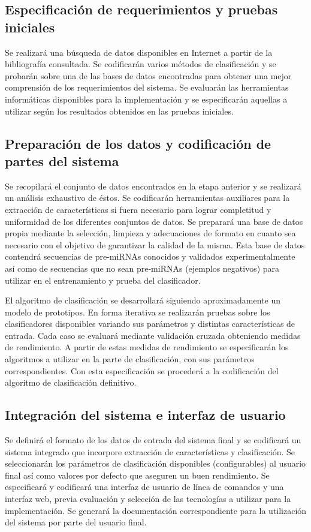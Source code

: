 \documentclass[12pt,bibliography=oldstyle,DIV=12,parskip=full-,titlepage]{scrartcl}
\begin{document}
\subsection{Especificación de requerimientos y pruebas iniciales}
Se realizará una búsqueda de datos disponibles en Internet a partir de
la bibliografía consultada.  Se codificarán varios métodos de
clasificación y se probarán sobre una de las bases de datos
encontradas para obtener una mejor comprensión de los requerimientos
del sistema.
%
Se evaluarán las herramientas informáticas disponibles para la
implementación y se especificarán aquellas a utilizar según los
resultados obtenidos en las pruebas iniciales.
%
\subsection{Preparación de los datos y codificación de partes del sistema}
Se recopilará el conjunto de datos encontrados en la etapa anterior y
se realizará un análisis exhaustivo de éstos.  Se codificarán
herramientas auxiliares para la extracción de características si fuera
necesario para lograr completitud y uniformidad de los diferentes
conjuntos de datos.  Se preparará una base de datos propia mediante la
selección, limpieza y adecuaciones de formato en cuanto sea necesario
con el objetivo de garantizar la calidad de la misma. Esta base de
datos contendrá secuencias de pre-miRNAs conocidos y validados
experimentalmente así como de secuencias que no sean pre-miRNAs
(ejemplos negativos) para utilizar en el entrenamiento y prueba del
clasificador.

El algoritmo de clasificación se desarrollará siguiendo
aproximadamente un modelo de prototipos. En forma iterativa se
realizarán pruebas sobre los clasificadores disponibles variando sus
parámetros y distintas características de entrada. Cada caso se
evaluará mediante validación cruzada obteniendo medidas de
rendimiento. A partir de estas medidas de rendimiento se especificarán
los algoritmos a utilizar en la parte de clasificación, con sus
parámetros correspondientes. Con esta especificación se procederá a la
codificación del algoritmo de clasificación definitivo.
%
\subsection{Integración del sistema e interfaz de usuario}
Se definirá el formato de los datos de entrada del sistema final y se
codificará un sistema integrado que incorpore extracción de
características y clasificación. Se seleccionarán los parámetros de
clasificación disponibles (configurables) al usuario final así como
valores por defecto que aseguren un buen rendimiento.
%
Se especificará y codificará una interfaz de usuario de línea de
comandos y una interfaz web, previa evaluación y selección de las
tecnologías a utilizar para la implementación.  Se generará la
documentación correspondiente para la utilización del sistema por
parte del usuario final.
%
\end{document}
